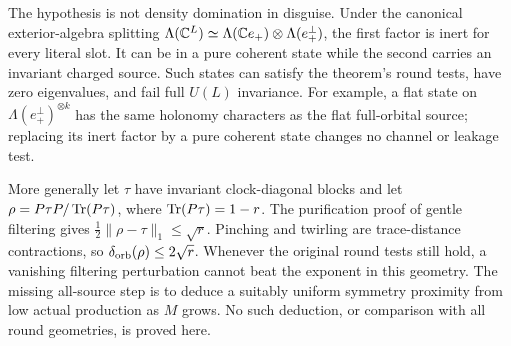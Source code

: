 The hypothesis is not density domination in disguise. Under the
canonical exterior-algebra splitting
$\Lambda(\mathbb C^L)\simeq\Lambda(\mathbb C e_+)\otimes\Lambda(e_+^\perp)$,
the first factor is inert for every literal slot. It can be in a pure
coherent state while the second carries an invariant charged source.
Such states can satisfy the theorem's round tests, have zero
eigenvalues, and fail full $U(L)$ invariance. For example, a flat
state on $\Lambda(e_+^\perp)^{\otimes k}$ has the same holonomy
characters as the flat full-orbital source; replacing its inert
factor by a pure coherent state changes no channel or leakage test.

More generally let $\tau$ have invariant clock-diagonal blocks and
let $\rho=P\tau P/\operatorname{Tr}(P\tau)$, where $\operatorname{Tr}(P\tau)=1-r$.
The purification proof of gentle filtering gives
$\frac12\|\rho-\tau\|_1\leq\sqrt r$. Pinching and twirling are
trace-distance contractions, so
$\delta_{\rm orb}(\rho)\leq2\sqrt r$. Whenever the original
round tests still hold, a vanishing filtering perturbation cannot
beat the exponent in this geometry. The missing all-source step is
to deduce a suitably uniform symmetry proximity from low actual
production as $M$ grows. No such deduction, or comparison with all
round geometries, is proved here.
